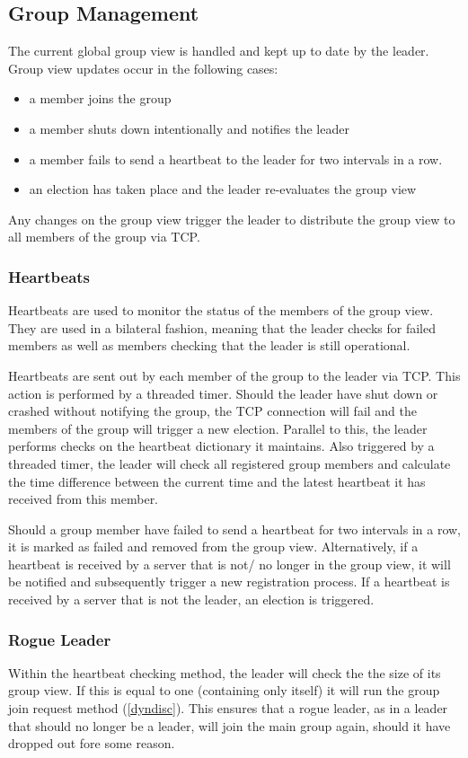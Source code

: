 \documentclass[runningheads]{llncs}
\begin{document}
\subsection{Group Management} \label{grpmngmnt}

The current global group view is handled and kept up to date by the leader. Group view updates occur in the following cases:
\begin{itemize}
    \item a member joins the group
    \item a member shuts down intentionally and notifies the leader
    \item a member fails to send a heartbeat to the leader for two intervals in a row.
    \item an election has taken place and the leader re-evaluates the group view
\end{itemize}
Any changes on the group view trigger the leader to distribute the group view to all members of the group via TCP.

\subsubsection{Heartbeats} \label{heartbeats}

Heartbeats are used to monitor the status of the members of the group view. They are used in a bilateral fashion, meaning that the leader checks for failed members as well as members checking that the leader is still operational.

Heartbeats are sent out by each member of the group to the leader via TCP. This action is performed by a threaded timer. Should the leader have shut down or crashed without notifying the group, the TCP connection will fail and the members of the group will trigger a new election. Parallel to this, the leader performs checks on the heartbeat dictionary it maintains. Also triggered by a threaded timer, the leader will check all registered group members and calculate the time difference between the current time and the latest heartbeat it has received from this member.

Should a group member have failed to send a heartbeat for two intervals in a row, it is marked as failed and removed from the group view. Alternatively, if a heartbeat is received by a server that is not/ no longer in the group view, it will be notified and subsequently trigger a new registration process. If a heartbeat is received by a server that is not the leader, an election is triggered.

\subsubsection{Rogue Leader} \label{rogueleader}
Within the heartbeat checking method, the leader will check the the size of its group view. If this is equal to one (containing only itself) it will run the group join request method (\ref{dyndisc}). This ensures that a rogue leader, as in a leader that should no longer be a leader, will join the main group again, should it have dropped out fore some reason.
\end{document}
